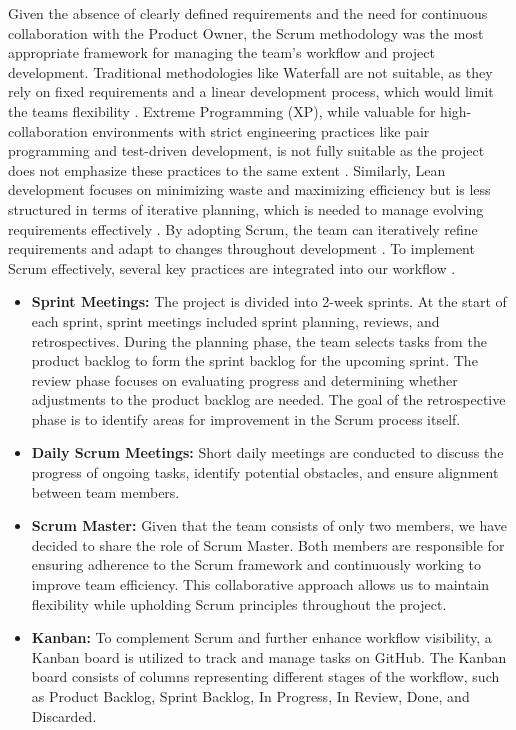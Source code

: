 Given the absence of clearly defined requirements and the need for continuous collaboration with the Product Owner, the Scrum methodology was the most appropriate framework for managing the team’s workflow and project development. Traditional methodologies like Waterfall are not suitable, as they rely on fixed requirements and a linear development process, which would limit the teams flexibility \cite{waterfall_model_enwiki:1275499744}. Extreme Programming (XP), while valuable for high-collaboration environments with strict engineering practices like pair programming and test-driven development, is not fully suitable as the project does not emphasize these practices to the same extent \cite{extreme_programming}. Similarly, Lean development focuses on minimizing waste and maximizing efficiency but is less structured in terms of iterative planning, which is needed to manage evolving requirements effectively \cite{lean_programming}. By adopting Scrum, the team can iteratively refine requirements and adapt to changes throughout development \cite{sdlc_model}. To implement Scrum effectively, several key practices are integrated into our workflow \cite{scrum_guide}.

\begin{itemize}
    \item \textbf{Sprint Meetings:} The project is divided into 2-week sprints. At the start of each sprint, sprint meetings included sprint planning, reviews, and retrospectives. During the planning phase, the team selects tasks from the product backlog to form the sprint backlog for the upcoming sprint. The review phase focuses on evaluating progress and determining whether adjustments to the product backlog are needed. The goal of the retrospective phase is to identify areas for improvement in the Scrum process itself.
    \item \textbf{Daily Scrum Meetings:} Short daily meetings are conducted to discuss the progress of ongoing tasks, identify potential obstacles, and ensure alignment between team members. 
    \item \textbf{Scrum Master:} Given that the team consists of only two members, we have decided to share the role of Scrum Master. Both members are responsible for ensuring adherence to the Scrum framework and continuously working to improve team efficiency. This collaborative approach allows us to maintain flexibility while upholding Scrum principles throughout the project.
    \item \textbf{Kanban:} To complement Scrum and further enhance workflow visibility, a Kanban board is utilized to track and manage tasks on GitHub. The Kanban board consists of columns representing different stages of the workflow, such as Product Backlog, Sprint Backlog, In Progress, In Review, Done, and Discarded.
\end{itemize}

